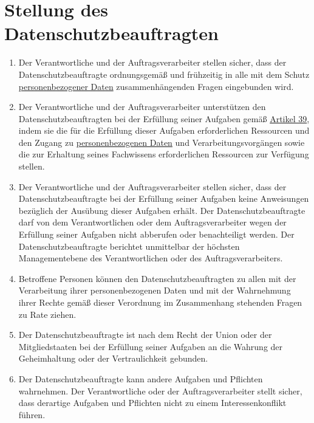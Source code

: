 \chapter{Stellung des Datenschutzbeauftragten}
\label{ch:38}


\begin{enumerate}

  \item Der Verantwortliche und der Auftragsverarbeiter stellen sicher, dass der Datenschutzbeauftragte ordnungsgemäß
   und frühzeitig in alle mit dem Schutz \hyperref[itm:04-1]{personenbezogener Daten} zusammenhängenden Fragen eingebunden wird.
  \label{itm:38-1}

  \item Der Verantwortliche und der Auftragsverarbeiter unterstützen den Datenschutzbeauftragten bei der Erfüllung
   seiner Aufgaben gemäß \hyperref[ch:39]{Artikel 39}, indem sie die für die Erfüllung dieser Aufgaben erforderlichen
   Ressourcen und den Zugang zu \hyperref[itm:04-1]{personenbezogenen Daten} und Verarbeitungsvorgängen sowie die zur Erhaltung seines
   Fachwissens erforderlichen Ressourcen zur Verfügung stellen.
  \label{itm:38-2}

  \item Der Verantwortliche und der Auftragsverarbeiter stellen sicher, dass der Datenschutzbeauftragte bei der
   Erfüllung seiner Aufgaben keine Anweisungen bezüglich der Ausübung dieser Aufgaben erhält. Der
   Datenschutzbeauftragte darf von dem Verantwortlichen oder dem Auftragsverarbeiter wegen der Erfüllung seiner
   Aufgaben nicht abberufen oder benachteiligt werden. Der Datenschutzbeauftragte berichtet unmittelbar der höchsten
   Managementebene des Verantwortlichen oder des Auftragsverarbeiters.
  \label{itm:38-3}

  \item Betroffene Personen können den Datenschutzbeauftragten zu allen mit der Verarbeitung ihrer personenbezogenen
   Daten und mit der Wahrnehmung ihrer Rechte gemäß dieser Verordnung im Zusammenhang stehenden Fragen zu Rate ziehen.
  \label{itm:38-4}

  \item Der Datenschutzbeauftragte ist nach dem Recht der Union oder der Mitgliedstaaten bei der Erfüllung seiner
   Aufgaben an die Wahrung der Geheimhaltung oder der Vertraulichkeit gebunden.
  \label{itm:38-5}

  \item Der Datenschutzbeauftragte kann andere Aufgaben und Pflichten wahrnehmen. Der Verantwortliche oder der
   Auftragsverarbeiter stellt sicher, dass derartige Aufgaben und Pflichten nicht zu einem Interessenkonflikt führen.
  \label{itm:38-6}

\end{enumerate}


